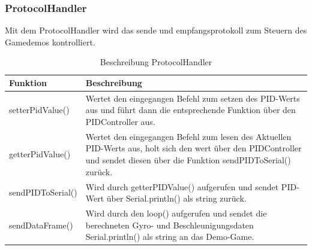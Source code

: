 \subsubsection{ProtocolHandler}
Mit dem ProtocolHandler wird das sende und empfangsprotokoll zum Steuern des Gamedemos kontrolliert.
\begin{table}[H]
  \centering
  \settowidth{}
  \setlength\extrarowheight{2pt}
  \begin{tabulary}{1.0\textwidth}{|L|L|}
    \hline
    \textbf{Funktion} &
    \textbf{Beschreibung}\\
    \hline
    setterPidValue() &
    Wertet den eingegangen Befehl zum setzen des PID-Werts aus und führt dann die entsprechende Funktion über den PIDController aus. \\
    \hline
    getterPidValue() &
    Wertet den eingegangen Befehl zum lesen des Aktuellen PID-Werts aus, holt sich den wert über den PIDController und sendet diesen über die Funktion sendPIDToSerial() zurück.\\
    \hline
    sendPIDToSerial() & 
    Wird durch getterPIDValue() aufgerufen und sendet PID-Wert über Serial.println() als string zurück.\\
    \hline
    sendDataFrame() &
    Wird durch den loop() aufgerufen und sendet die berechneten Gyro- und Beschleunigungsdaten Serial.println() als string an das Demo-Game.\\
    \hline
  \end{tabulary}
  \caption{Beschreibung ProtocolHandler}
\end{table}

\newpage